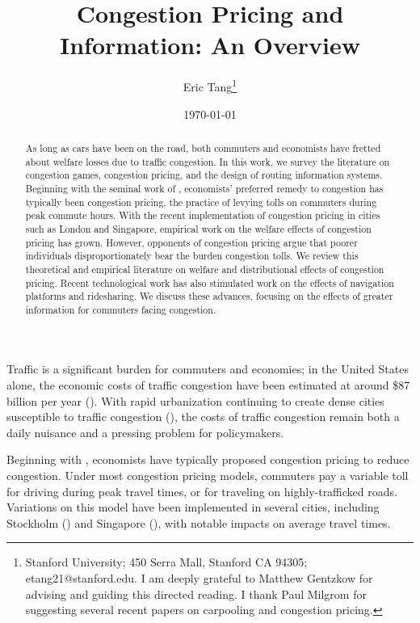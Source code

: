\documentclass[JEL]{AEA}
\begin{document}
\title{Congestion Pricing and Information: An Overview}
\author{Eric Tang\thanks{%
Stanford University; 450 Serra Mall, Stanford CA 94305; etang21@stanford.edu.
I am deeply grateful to Matthew Gentzkow for advising and guiding this directed reading. I thank Paul Milgrom for suggesting several recent papers on carpooling and congestion pricing.
}}
\date{\today}
\pubVolume{}
\pubIssue{}

\begin{abstract}
As long as cars have been on the road, both commuters and economists have fretted about welfare losses due to traffic congestion. In this work, we survey the literature on congestion games, congestion pricing, and the design of routing information systems. Beginning with the seminal work of \cite{vickrey-1969}, economists' preferred remedy to congestion has typically been congestion pricing, the practice of levying tolls on commuters during peak commute hours. With the recent implementation of congestion pricing in cities such as London and Singapore, empirical work on the welfare effects of congestion pricing has grown. However, opponents of congestion pricing argue that poorer individuals disproportionately bear the burden congestion tolls. We review this theoretical and empirical literature on welfare and distributional effects of congestion pricing. Recent technological work has also stimulated work on the effects of navigation platforms and ridesharing. We discuss these advances, focusing on the effects of greater information for commuters facing congestion.
\end{abstract}

\maketitle

Traffic is a significant burden for commuters and economies; in the United States alone, the economic costs of traffic congestion have been estimated at around \$87 billion per year (\cite{fleming-2018}). With rapid urbanization continuing to create dense cities susceptible to traffic congestion (\cite{bryan-2020}), the costs of traffic congestion remain both a daily nuisance and a pressing problem for policymakers.

Beginning with \cite{vickrey-1969}, economists have typically proposed congestion pricing to reduce congestion. Under most congestion pricing models, commuters pay a variable toll for driving during peak travel times, or for traveling on highly-trafficked roads. Variations on this model have been implemented in several cities, including Stockholm (\cite{eliasson-2006}) and Singapore (\cite{olszweski-2005}), with notable impacts on average travel times.
\end{document}
